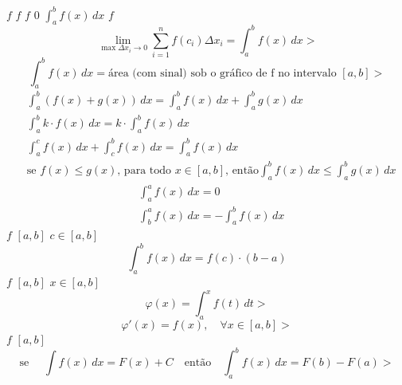 \documentclass{article}
\begin{document}
$f$
$f$
$f$
$0$
$\displaystyle\int_a^b{f(x)}\,dx$
$f$
$$
\lim_{\max{\Delta x_i\to 0}}\sum_{i=1}^{n}f(c_i)\Delta x_i = \int_a^b{f(x)}\,dx
>$$
$$
\int_a^b{f(x)}\,dx=\text{área (com sinal) sob o gráfico de f no intervalo } [a,b]
>$$
$$
\begin{aligned}
&\int_a^b{(f(x)+g(x))}\,dx=\int_a^b{f(x)}\,dx+\int_a^b{g(x)}\,dx\\
&\int_a^b{k\cdot f(x)}\,dx=k\cdot \int_a^b{f(x)}\,dx\\
&\int_a^c{f(x)}\,dx+\int_c^b{f(x)}\,dx=\int_a^b{f(x)}\,dx\\
&\text{se } f(x)\le g(x)\text{, para todo }x\in[a,b]\text{, então}\int_a^b{f(x)}\,dx\le\int_a^b{g(x)}\,dx
\end{aligned}
$$
$$
\begin{aligned}
&\int_a^a{f(x)}\,dx=0\\
&\int_b^a{f(x)}\,dx=- \int_a^b{f(x)}\,dx
\end{aligned}
$$
$f$
$[a,b]$
$c\in[a,b]$
$$
\int_a^b{f(x)}\,dx=f(c)\cdot(b-a)
$$
$f$
$[a,b]$
$x\in[a,b]$
$$
\varphi(x)=\int_a^x{f(t)}\,dt
>$$
$$
\varphi'(x)=f(x), \quad\forall x\in[a,b]
>$$
$f$
$[a,b]$
$$
\text{se }\quad \int{f(x)}\,dx=F(x)+C\quad\text{então}\quad \int_a^b{f(x)}\,dx=F(b)-F(a)
>$$
\end{document}
